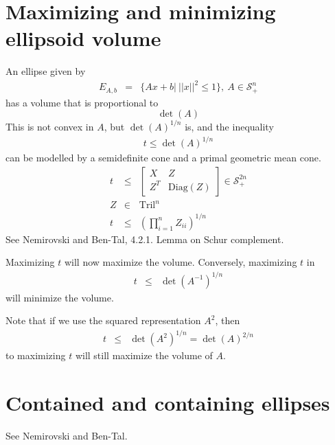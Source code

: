 \documentclass{article}
\begin{document}
\section{Maximizing and minimizing ellipsoid volume}

An ellipse given by
\begin{eqnarray}
    E_{A,b} &=& \{ Ax+b | \  || x ||^2 \leq 1\},\  A\in\mathcal{S}^n_+
\end{eqnarray}
has a volume that is proportional to
\[
    \det(A)
\]
This is not convex in $A$, but $\det(A)^{1/n}$ is, and the inequality
\begin{eqnarray}
    t\leq \det(A)^{1/n}
\end{eqnarray}
can be modelled by a semidefinite cone and a primal geometric mean cone.
\begin{eqnarray}
    t &\leq& 
    \left[
        \begin{array}{cc}
            X & Z \\
            Z^T & \mathrm{Diag}(Z)
        \end{array}
    \right]
    \in\mathcal{S}^{2n}_+ \\
    Z & \in & \mathrm{Tril}^n \\
    t & \leq & \left( \prod^n_{i=1} Z_{ii}\right)^{1/n}
\end{eqnarray}
See Nemirovski and Ben-Tal, 4.2.1. Lemma on Schur complement. 

Maximizing $t$ will now maximize the volume. Conversely, maximizing $t$ in 
\begin{eqnarray}
    t &\leq& \det(A^{-1})^{1/n}
\end{eqnarray}
will minimize the volume.

Note that if we use the squared representation $A^2$, then
\begin{eqnarray}
    t &\leq& \det(A^{2})^{1/n} = \det(A)^{2/n}
\end{eqnarray}
to maximizing $t$ will still maximize the volume of $A$.


\section{Contained and containing ellipses}

See Nemirovski and Ben-Tal.
\end{document}
